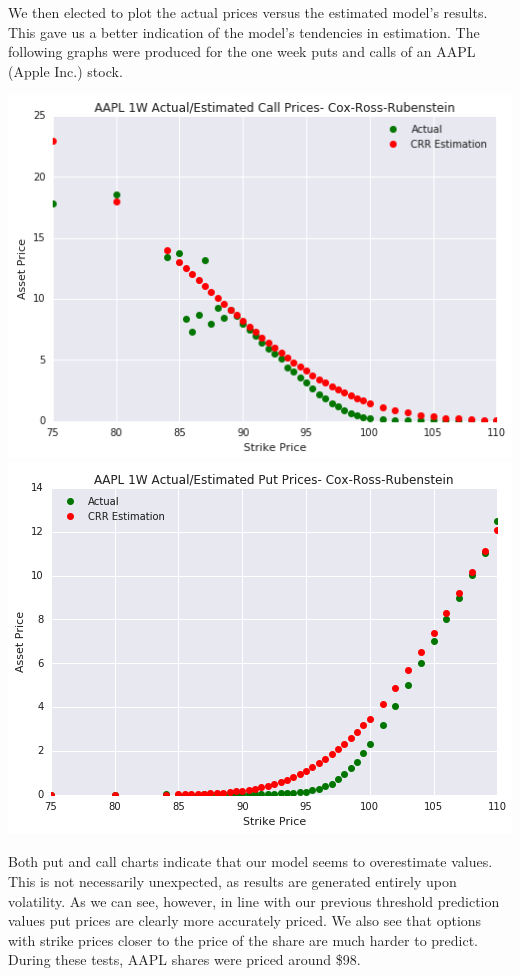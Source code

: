 We then elected to plot the actual prices versus the estimated model's results. This gave us a better indication of the model's tendencies in estimation. The following graphs were produced for the one week puts and calls of an AAPL (Apple Inc.) stock. 

\begin{center}
\includegraphics[scale=0.66, keepaspectratio=true]{Chapter3/CRRCall1W.png}
\includegraphics[scale=0.66, keepaspectratio=true]{Chapter3/CRRPut1W.png}
\end{center}

Both put and call charts indicate that our model seems to overestimate values. This is not necessarily unexpected, as results are generated entirely upon volatility. As we can see, however, in line with our previous threshold prediction values put prices are clearly more accurately priced. We also see that options with strike prices closer to the price of the share are much harder to predict. During these tests, AAPL shares were priced around \$98. 


